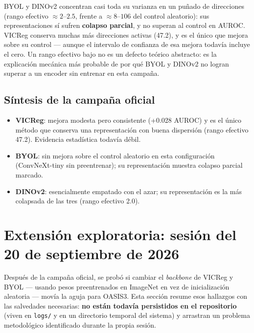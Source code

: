 \documentclass[11pt,a4paper]{article}
\begin{document}
\begin{warnbox}
BYOL y DINOv2 concentran casi toda su varianza en un puñado de direcciones
(rango efectivo $\approx2$--$2.5$, frente a $\approx8$--$106$ del control
aleatorio): sus representaciones sí sufren \textbf{colapso parcial}, y no
superan al control en AUROC. VICReg conserva muchas más direcciones activas
(47.2), y es el único que mejora sobre su control --- aunque el intervalo de
confianza de esa mejora todavía incluye el cero. Un rango efectivo bajo no es
un defecto teórico abstracto: es la explicación mecánica más probable de por
qué BYOL y DINOv2 no logran superar a un encoder sin entrenar en esta
campaña.
\end{warnbox}

\subsection{Síntesis de la campaña oficial}

\begin{itemize}
\item \textbf{VICReg}: mejora modesta pero consistente (+0.028 AUROC) y es
  el único método que conserva una representación con buena dispersión
  (rango efectivo 47.2). Evidencia estadística todavía débil.
\item \textbf{BYOL}: sin mejora sobre el control aleatorio en esta
  configuración (ConvNeXt-tiny sin preentrenar); su representación muestra
  colapso parcial marcado.
\item \textbf{DINOv2}: esencialmente empatado con el azar; su
  representación es la más colapsada de las tres (rango efectivo 2.0).
\end{itemize}

\section{Extensión exploratoria: sesión del 20 de septiembre de 2026}
\label{sec:extension}

Después de la campaña oficial, se probó si cambiar el \emph{backbone} de
VICReg y BYOL --- usando pesos preentrenados en ImageNet en vez de
inicialización aleatoria --- movía la aguja para OASIS3. Esta sección resume
esos hallazgos con las salvedades necesarias: \textbf{no están todavía
persistidos en el repositorio} (viven en \texttt{logs/} y en un directorio
temporal del sistema) y arrastran un problema metodológico identificado
durante la propia sesión.
\end{document}
